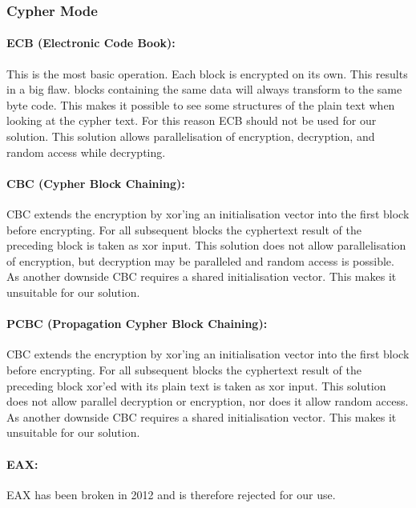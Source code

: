 
\subsubsection{Cypher Mode}
\paragraph{ECB (Electronic Code Book):} This is the most basic operation. Each block is encrypted on its own. This results in a big flaw. blocks containing the same data will always transform to the same byte code. This makes it possible to see some structures of the plain text when looking at the cypher text. For this reason ECB should not be used for our solution. This solution allows parallelisation of encryption, decryption, and random access while decrypting.

\paragraph{CBC (Cypher Block Chaining):}  CBC extends the encryption by xor'ing an initialisation vector into the first block before encrypting. For all subsequent blocks the cyphertext result of the preceding block is taken as xor input. This solution does not allow parallelisation of encryption, but decryption may be paralleled and random access is possible. As another downside CBC requires a shared initialisation vector. This makes it unsuitable for our solution.

\paragraph{PCBC (Propagation Cypher Block Chaining):}  CBC extends the encryption by xor'ing an initialisation vector into the first block before encrypting. For all subsequent blocks the cyphertext result of the preceding block xor'ed with its plain text is taken as xor input. This solution does not allow parallel decryption or encryption, nor does it allow random access. As another downside CBC requires a shared initialisation vector. This makes it unsuitable for our solution.

\paragraph{EAX:} EAX has been broken in 2012\cite{minematsu2013attacks} and is therefore rejected for our use.

